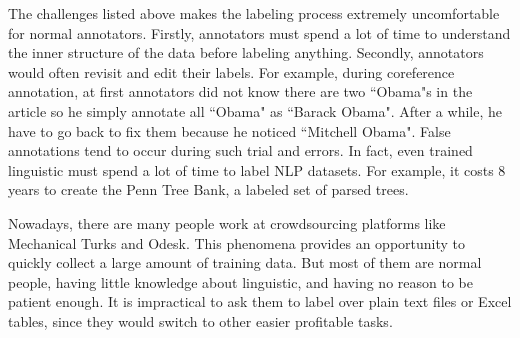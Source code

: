 The challenges listed above makes the labeling process extremely uncomfortable for normal annotators. Firstly, annotators must spend a lot of time to understand the inner structure of the data before labeling anything. Secondly, annotators would often revisit and edit their labels. For example, during coreference annotation, at first annotators did not know there are two ``Obama"s in the article so he simply annotate all ``Obama" as ``Barack Obama". After a while, he have to go back to fix them because he noticed ``Mitchell Obama". False annotations tend to occur during such trial and errors. In fact, even trained linguistic must spend a lot of time to label NLP datasets. For example, it costs 8 years to create the Penn Tree Bank, a labeled set of parsed trees. 

Nowadays, there are many people work at crowdsourcing platforms like Mechanical Turks and Odesk. This phenomena provides an opportunity to quickly collect a large amount of training data. But most of them are normal people, having little knowledge about linguistic, and having no reason to be patient enough. It is impractical to ask them to label over plain text files or Excel tables, since they would switch to other easier profitable tasks.